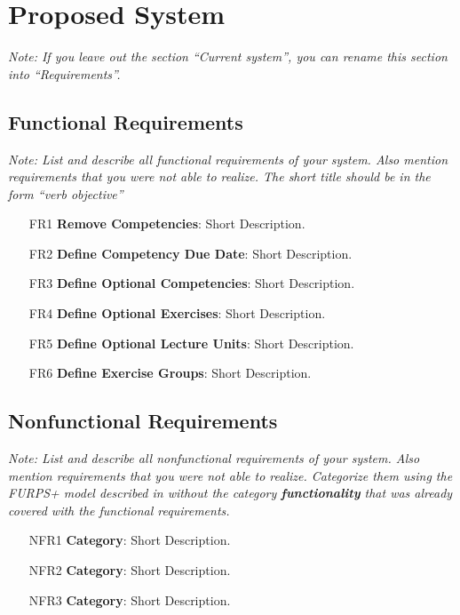 \documentclass[a4paper,12pt,twoside]{report}
\begin{document}
\section{Proposed System}

\textit{Note: If you leave out the section ``Current system'', you can rename this section into ``Requirements''.}

\subsection{Functional Requirements}

\textit{Note: List and describe all functional requirements of your system. Also mention requirements that you were not able to realize. The short title should be in the form ``verb objective''}

\begin{itemize}
	\item [FR1] \textbf{Remove Competencies}: Short Description.
	\item [FR2] \textbf{Define Competency Due Date}: Short Description.
	\item [FR3] \textbf{Define Optional Competencies}: Short Description.
	\item [FR4] \textbf{Define Optional Exercises}: Short Description.
	\item [FR5] \textbf{Define Optional Lecture Units}: Short Description.
	\item [FR6] \textbf{Define Exercise Groups}: Short Description.
\end{itemize}




\subsection{Nonfunctional Requirements}

\textit{Note: List and describe all nonfunctional requirements of your system. Also mention requirements that you were not able to realize. Categorize them using the FURPS+ model described in \cite{bruegge2004object} without the category \textbf{functionality} that was already covered with the functional requirements.}

\begin{itemize}
	\item [NFR1] \textbf{Category}: Short Description.
	\item [NFR2] \textbf{Category}: Short Description.
	\item [NFR3] \textbf{Category}: Short Description.
\end{itemize}
\end{document}
